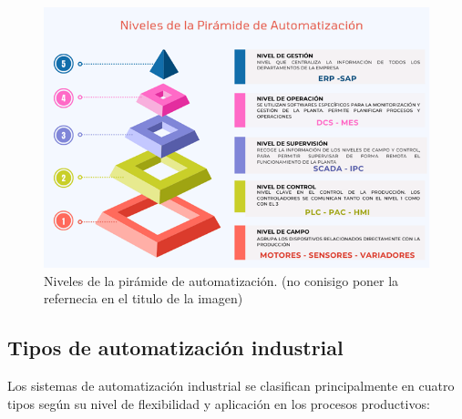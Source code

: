 \begin{figure} [h!]
  \begin{center}
    \includegraphics[width=16cm]{figs/esquema_automatizacion}
  \end{center}
  \caption{\centering Niveles de la pirámide de automatización. (no conisigo poner la refernecia en el titulo de la imagen)}  
  \label{fig:esquema_automatizacion}
\end{figure}  



\subsection{Tipos de automatización industrial}

Los sistemas de automatización industrial se clasifican principalmente en cuatro tipos según su nivel de flexibilidad y aplicación en los procesos productivos:

